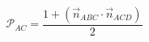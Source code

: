 \documentclass{article}
\begin{document}
\[
    \mathcal{P}_{AC} = \frac{1 + \left( \vec n_{ABC} \cdot \vec n_{ACD}
    \right)}{2}
\]
\end{document}
